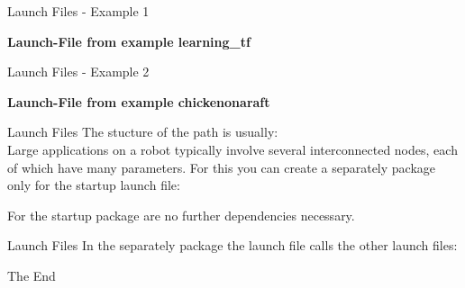 \documentclass{beamer}
\begin{document}
\begin{frame}{Launch Files - Example 1}
\begin{large}
	\textbf{Launch-File from example learning\_tf} 
\end{large}

\end{frame}
\begin{frame}{Launch Files - Example 2}
	\begin{large}
		\textbf{Launch-File from example chickenonaraft} 
	\end{large}

\end{frame}
\begin{frame}{Launch Files}
	The stucture of the path is usually: \\

	
	Large applications on a robot typically involve several interconnected nodes, each of which have many parameters. For this you can create a separately package only for the startup launch file:

	For the startup package are no further dependencies necessary.
	
\end{frame}
\begin{frame}{Launch Files}
In the separately package the launch file calls the other launch files:

\end{frame}
\begin{frame}
\Huge{\centerline{The End}}
\end{frame}
\end{document}
